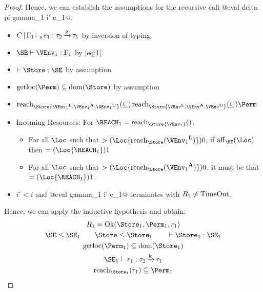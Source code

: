 \begin{proof}
  Hence, we can establish the assumptions for the recursive call
  @eval delta pi gamma_1 i' e_1@.
  \begin{itemize}
  \item  $C \operatorname{|} \Gamma_1 \operatorname{\vdash_s} e_1 : \tau_2\operatorname{\xrightarrow{k}}\tau_1$ by inversion of typing
  \item $\SE \vdash \VEnv_1 : \E_1$ by \eqref{eq:1}
  \item $\vdash \Store : \SE$ by assumption
  \item $\Rawloc\Perm \subseteq \Dom\Store$ by assumption
  \item $
    \Reach\Store{\Active{\VEnv_1}, \MutableBorrows{\VEnv_1},
      \ImmutableBorrows{\VEnv_1}}
    \subseteq
    \Reach\Store{\Active\VEnv, \MutableBorrows\VEnv, \ImmutableBorrows\VEnv}
    \subseteq \Perm$
  \item Incoming Resources: For $\REACH_1 = \Reach\Store{\VEnv_1}$.
    \begin{itemize}
    \item
      For all $\Loc$ such that $\MultiNumber\Loc{\Reach{\Store}{\Active{\VEnv_1}}} >0$,
      if $\Affine{\SE}\Loc$ then $\MultiNumber\Loc{\REACH_1}= 1$
    \item For all $\Loc$ such that $
      \MultiNumber\Loc{\Reach{\Store}{\MutableBorrows{\VEnv_1}}} >0$, it
      must be that $\MultiNumber\Loc{\REACH_1}=1$.
    \end{itemize}
  \item $i'<i$ and   @eval \Store \Perm gamma_1 i' e_1@ terminates
    with $R_1 \ne \operatorname{TimeOut}$.
  \end{itemize}
  Hence, we can apply the inductive hypothesis and obtain:
  \begin{gather}
    \label{eq:2}
    R_1 = \Ok{\Store_1, \Perm_1, r_1}
    \\
    \SE \le \SE_1 \qquad
    \Store \le \Store_1 \qquad
    \vdash \Store_1 :    \SE_1
    \\
    \Rawloc{\Perm_1} \subseteq \Dom{\Store_1}
    \\\label{eq:3}
    \SE_1 \vdash r_1 : \tau_2\tarr{k}\tau_1
    \\\label{eq:10}
    \Reach{\Store_1}{r_1} \subseteq \Perm_1
  \end{gather}
\end{proof}
